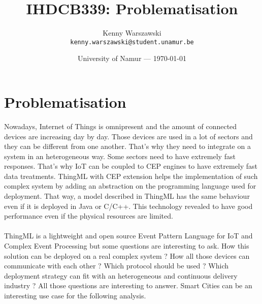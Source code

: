 \documentclass{article}
\title{IHDCB339: Problematisation}
\author{Kenny Warszawski\\ \texttt{kenny.warszawski@student.unamur.be}}
\date{University of Namur --- \today}
\begin{document}
\maketitle 

\section{Problematisation}

Nowadays, Internet of Things is omnipresent and the amount of connected devices are increasing day by day. Those devices are used in a lot of sectors and they can be different from one another. That's why they need to integrate on a system in an heterogeneous way. Some sectors need to have extremely fast responses. That's why IoT can be coupled to CEP engines to have extremely fast data treatments. ThingML with CEP extension helps the implementation of such complex system by adding an abstraction on the programming language used for deployment. That way, a model described in ThingML has the same behaviour even if it is deployed in Java or C/C++. This technology revealed to have good performance even if the physical resources are limited. 
\\ \\
ThingML is a lightweight and open source Event Pattern Language for IoT and Complex Event Processing but some questions are interesting to ask. How this solution can be deployed on a real complex system ? How all those devices can communicate with each other ? Which protocol should be used ? Which deployment strategy can fit with an heterogeneous and continuous delivery industry ? All those questions are interesting to answer. Smart Cities can be an interesting use case for the following analysis.
\end{document}
